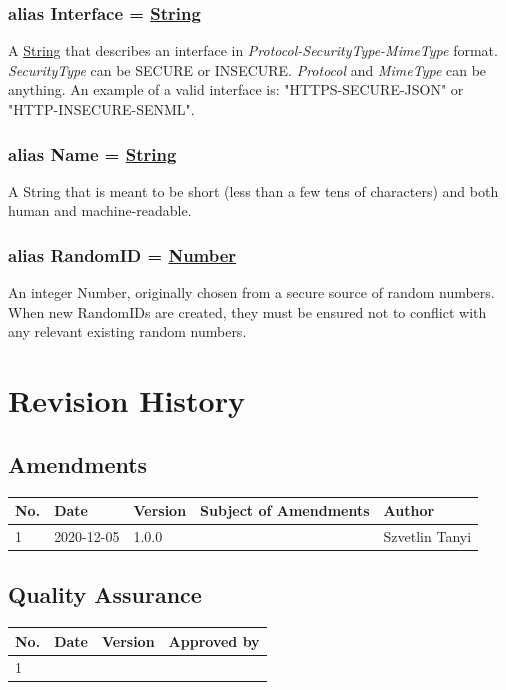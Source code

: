 \documentclass[a4paper]{arrowhead}
\newcommand{\pdef}[1]{{\textcolor{ArrowheadGrey}{#1 \label{sec:model:primitives:#1} \label{sec:model:primitives:#1s}}}}
\newcommand{\pref}[1]{{\textcolor{ArrowheadGrey}{\hyperref[sec:model:primitives:#1]{#1}}}}
\begin{document}
\subsubsection{alias \pdef{Interface} = \pref{String}}

A \pref{String} that describes an interface in \textit{Protocol-SecurityType-MimeType} format. \textit{SecurityType} can be SECURE or INSECURE. \textit{Protocol} and \textit{MimeType} can be anything. An example of a valid interface is: "HTTPS-SECURE-JSON" or "HTTP-INSECURE-SENML".

\subsubsection{alias \pdef{Name} = \pref{String}}

A String that is meant to be short (less than a few tens of characters) and both human and machine-readable.

\subsubsection{alias \pdef{RandomID} = \pref{Number}}

An integer Number, originally chosen from a secure source of random numbers. When new RandomIDs are created, they must be ensured not to conflict with any relevant existing random numbers.

\newpage




\newpage

\section{Revision History}
\subsection{Amendments}

\noindent\begin{tabularx}{\textwidth}{| p{1cm} | p{3cm} | p{2cm} | X | p{4cm} |} \hline
\rowcolor{gray!33} No. & Date & Version & Subject of Amendments & Author \\ \hline

1 & 2020-12-05 & 1.0.0 & & Szvetlin Tanyi \\ \hline

\end{tabularx}

\subsection{Quality Assurance}

\noindent\begin{tabularx}{\textwidth}{| p{1cm} | p{3cm} | p{2cm} | X |} \hline
\rowcolor{gray!33} No. & Date & Version & Approved by \\ \hline

1 & & & \\ \hline

\end{tabularx}
\end{document}
